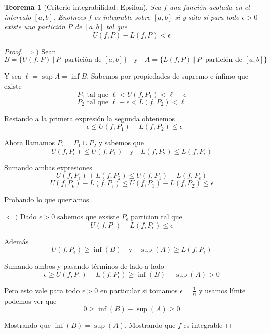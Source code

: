 \documentclass{article}
\theoremstyle{break}
\newtheorem{theorem}{Teorema}[section]
\begin{document}
\begin{theorem}[Criterio integrabilidad: Epsilon]
	Sea $f$ una función acotada en el intervalo $[a,b]$. Enotnces $f$ es integrable sobre $[a,b]$ 
	si y sólo si para todo $\epsilon > 0$ existe una partición $P$ de $[a,b]$ tal que \[ 
		U(f,P) - L(f,P) < \epsilon \]
\end{theorem}
\begin{proof}
	$\Rightarrow )$ Sean \[B=\{U(f,P) \ | \ P\ \text{ partición de } [a,b] \}
	\quad \text{y} \quad A=\{L(f,P) \ | \ P\ \text{ partición de } [a,b]\} \]

	Y sea $\ell = \sup A = \inf B$. Sabemos por propiedades de supremo e ínfimo que existe
	\[ P_1 \text{ tal que } \ell<U(f,P_1)<\ell + \epsilon\]
	\[ P_2 \text{ tal que } \ell - \epsilon <L(f,P_2) < \ell \]

	Restando a la primera expresión la segunda obtenemos 
	\[ -\epsilon \leq U(f,P_1) - L(f,P_2) \leq \epsilon \]

	Ahora llamamos $P_{\epsilon} = P_1 \cup P_2$ y sabemos que
	\[ U(f,P_{\epsilon}) \leq U(f,P_1) \quad \text{y}\quad L(f,P_2) \leq L(f,P_{\epsilon})\]
	
	Sumando ambas expresiones \[ U(f,P_{\epsilon}) + L(f,P_2) \leq U(f,P_1) + L(f,P_{\epsilon}) \]
	\[U(f,P_{\epsilon}) - L(f,P_{\epsilon}) \leq U(f,P_1) - L(f,P_2) \leq \epsilon \]

	Probando lo que queriamos

	$\Leftarrow )$ Dado $\epsilon > 0$ sabemos que exsiste $P_{\epsilon}$ particion tal que 
	\[U(f,P_{\epsilon}) - L(f,P_{\epsilon}) \leq \epsilon\]

	Además \[U(f,P_{\epsilon}) \geq \inf(B) \quad \text{y} \quad \sup(A) \geq L(f,P_{\epsilon}) \]

	Sumando ambos y pasando términos de lado a lado 
	\[ \epsilon \geq U(f,P_{\epsilon}) - L(f,P_{\epsilon}) \geq \inf(B) - \sup(A) > 0 \]

	Pero esto vale para todo $\epsilon > 0$ en particular si tomamos $\epsilon = \frac{1}{n}$ y
	usamos límte podemos ver que \[0 \geq  \inf(B) - \sup(A) \geq 0\]

	Mostrando que $\inf(B) = \sup(A)$. Mostrando que $f$ es integrable
\end{proof}
\end{document}
